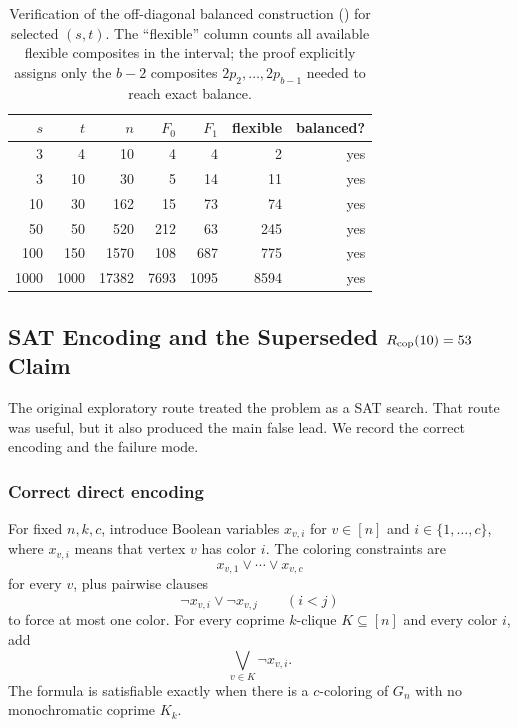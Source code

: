 \documentclass[11pt]{article}
\theoremstyle{plain}
\theoremstyle{definition}
\theoremstyle{remark}
\begin{document}
\begin{table}[htbp]
\centering
\caption{Verification of the off-diagonal balanced construction
() for selected $(s,t)$.  The ``flexible''
column counts all available flexible composites in the interval; the proof
explicitly assigns only the $b-2$ composites $2p_2,\ldots,2p_{b-1}$ needed
to reach exact balance.}
\label{tab:balanced-off-diagonal-verify}
\small
\begin{tabular}{@{}rrrrrrr@{}}
\toprule
$s$ & $t$ & $n$ & $F_0$ & $F_1$ & flexible & balanced? \\
\midrule
3 & 4 & 10 & 4 & 4 & 2 & yes \\
3 & 10 & 30 & 5 & 14 & 11 & yes \\
10 & 30 & 162 & 15 & 73 & 74 & yes \\
50 & 50 & 520 & 212 & 63 & 245 & yes \\
100 & 150 & 1570 & 108 & 687 & 775 & yes \\
1000 & 1000 & 17382 & 7693 & 1095 & 8594 & yes \\
\bottomrule
\end{tabular}

\end{table}

\subsection{\texorpdfstring{SAT Encoding and the Superseded $R_{\rm cop}(10)=53$ Claim}{SAT Encoding and the Superseded Rcop(10)=53 Claim}}
\label{app:sat-forensics}

The original exploratory route treated the problem as a SAT search.  That
route was useful, but it also produced the main false lead.  We record the
correct encoding and the failure mode.

\subsubsection{Correct direct encoding}

For fixed $n,k,c$, introduce Boolean variables $x_{v,i}$ for
$v\in[n]$ and $i\in\{1,\ldots,c\}$, where $x_{v,i}$ means that vertex $v$
has color $i$.  The coloring constraints are
\[
  x_{v,1}\vee\cdots\vee x_{v,c}
\]
for every $v$, plus pairwise clauses
\[
  \neg x_{v,i}\vee \neg x_{v,j}\qquad (i<j)
\]
to force at most one color.  For every coprime $k$-clique
$K\subseteq[n]$ and every color $i$, add
\[
  \bigvee_{v\in K}\neg x_{v,i}.
\]
The formula is satisfiable exactly when there is a $c$-coloring of $G_n$
with no monochromatic coprime $K_k$.
\end{document}
